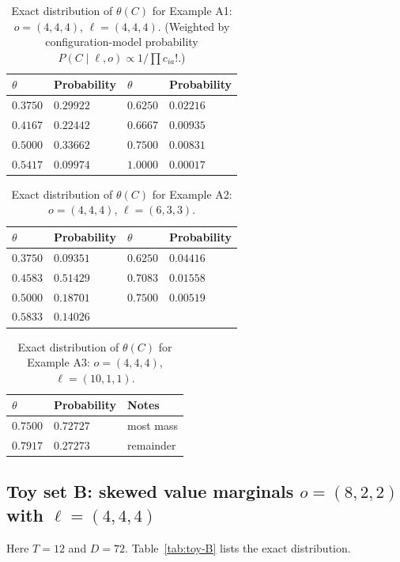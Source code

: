 \documentclass[11pt]{article}
\newcommand{\1}{\mathbf{1}}
\theoremstyle{plain}
\theoremstyle{definition}
\begin{document}
\begin{table}[htbp]
\centering
\caption{Exact distribution of $\theta(C)$ for Example A1: $o=(4,4,4)$, $\ell=(4,4,4)$.
(Weighted by configuration-model probability $P(C\mid \ell,o)\propto 1/\prod c_{ia}!$.)}
\label{tab:toy-A1}
\begin{tabular}{@{}llll@{}}
\toprule
$\theta$ & Probability & $\theta$ & Probability\\
\midrule
$0.3750$ & $0.29922$ & $0.6250$ & $0.02216$\\
$0.4167$ & $0.22442$ & $0.6667$ & $0.00935$\\
$0.5000$ & $0.33662$ & $0.7500$ & $0.00831$\\
$0.5417$ & $0.09974$ & $1.0000$ & $0.00017$\\
\bottomrule
\end{tabular}
\end{table}

\begin{table}[htbp]
\centering
\caption{Exact distribution of $\theta(C)$ for Example A2: $o=(4,4,4)$, $\ell=(6,3,3)$.}
\label{tab:toy-A2}
\begin{tabular}{@{}llll@{}}
\toprule
$\theta$ & Probability & $\theta$ & Probability\\
\midrule
$0.3750$ & $0.09351$ & $0.6250$ & $0.04416$\\
$0.4583$ & $0.51429$ & $0.7083$ & $0.01558$\\
$0.5000$ & $0.18701$ & $0.7500$ & $0.00519$\\
$0.5833$ & $0.14026$ & & \\
\bottomrule
\end{tabular}
\end{table}

\begin{table}[htbp]
\centering
\caption{Exact distribution of $\theta(C)$ for Example A3: $o=(4,4,4)$, $\ell=(10,1,1)$.}
\label{tab:toy-A3}
\begin{tabular}{@{}lll@{}}
\toprule
$\theta$ & Probability & Notes\\
\midrule
$0.7500$ & $0.72727$ & most mass\\
$0.7917$ & $0.27273$ & remainder\\
\bottomrule
\end{tabular}
\end{table}

\subsection{Toy set B: skewed value marginals \texorpdfstring{$o=(8,2,2)$}{o=(8,2,2)} with \texorpdfstring{$\ell=(4,4,4)$}{l=(4,4,4)}}
Here $T=12$ and $D=72$.
Table~\ref{tab:toy-B} lists the exact distribution.
\end{document}
